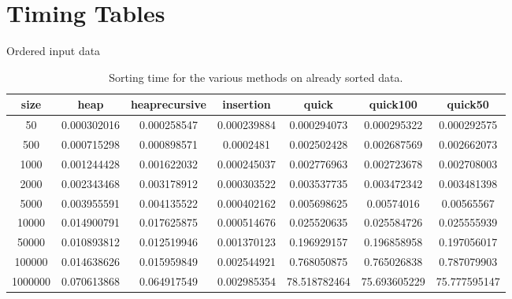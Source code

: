 \documentclass[a4paper,12pt]{article}
\begin{document}
\section{Timing Tables}
\begin{table}[h]
\caption {Ordered input data} 
\begin{tabular}{ccccccc}
size & heap & heaprecursive & insertion & quick & quick100 & quick50 \\ \hline
50 & 0.000302016 & 0.000258547 & 0.000239884 & 0.000294073 & 0.000295322 & 0.000292575 \\
500 & 0.000715298 & 0.000898571 & 0.0002481 & 0.002502428 & 0.002687569 & 0.002662073 \\
1000 & 0.001244428 & 0.001622032 & 0.000245037 & 0.002776963 & 0.002723678 & 0.002708003 \\
2000 & 0.002343468 & 0.003178912 & 0.000303522 & 0.003537735 & 0.003472342 & 0.003481398 \\
5000 & 0.003955591 & 0.004135522 & 0.000402162 & 0.005698625 & 0.00574016 & 0.00565567 \\
10000 & 0.014900791 & 0.017625875 & 0.000514676 & 0.025520635 & 0.025584726 & 0.025555939 \\
50000 & 0.010893812 & 0.012519946 & 0.001370123 & 0.196929157 & 0.196858958 & 0.197056017 \\
100000 & 0.014638626 & 0.015959849 & 0.002544921 & 0.768050875 & 0.765026838 & 0.787079903 \\
1000000 & 0.070613868 & 0.064917549 & 0.002985354 & 78.518782464 & 75.693605229 & 75.777595147 \\
\end{tabular}
\caption{Sorting time for the various methods on already sorted data.}
\end{table}
\end{document}
